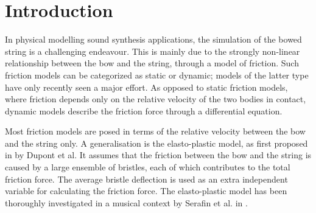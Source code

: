 \documentclass[twoside,a4paper,dvipsnames]{article}
\title{\papertitle}
\newif\ifpdf
\begin{document}
\ifpdf %
  \DeclareGraphicsExtensions{.png,.jpg,.pdf, .eps} 
\else  %
\fi

\maketitle
    
\begin{abstract}
The simulation of a bowed string is challenging due to the strongly non-linear relationship between the bow and the string. This relationship can be described through a model of friction. Several friction models in the literature have been proposed, from simple velocity dependent to more accurate ones. Similarly, a highly accurate technique to simulate a stiff string is the use of finite-difference schemes (FDSs). As accuracy implies computational complexity, implementation of these models in real-time is assumed to be a challenge. This paper presents a real-time implementation of the novel combination of a complex friction model, namely the elasto-plastic friction model, and the stiff string simulated using FDSs. We show that it is possible to keep the CPU usage of a single bowed string $<5\%$. For real-time control of the bowed string, the Sensel Morph is used. 
\end{abstract}
\section{Introduction}
\label{sec:intro}
In physical modelling sound synthesis applications, the simulation of the bowed string is a challenging endeavour. This is mainly due to the strongly non-linear relationship between the bow and the string, through a model of friction. Such friction models can be categorized as static or dynamic; models of the latter type have only recently seen a major effort. As opposed to static friction models, where friction depends only on the relative velocity of the two bodies in contact, dynamic models describe the friction force through a differential equation.

Most friction models are posed in terms of the relative velocity between the bow and the string only. A generalisation is the elasto-plastic model, as first proposed in \cite{Dupont2002} by Dupont et al. It assumes that the friction between the bow and the string is caused by a large ensemble of bristles, each of which contributes to the total friction force. The average bristle deflection is used as an extra independent variable for calculating the friction force. The elasto-plastic model has been thoroughly investigated in a musical context by Serafin et al. in \cite{Serafin2004, Serafin2003, Avanzini2005}.
\end{document}
